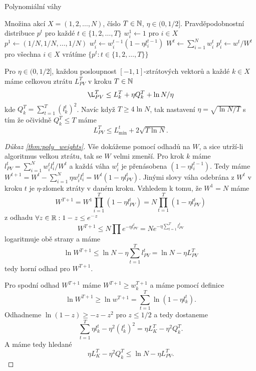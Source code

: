 
\begin{algorithm}
    \algrenewcommand{}
    \algrenewcommand{}
    \caption{Polynomiální váhy}
    \label{alg:poly_weights}
    \begin{algorithmic}[1]
        \Require  Množina akcí $X =(1,2,\dots,N)$, číslo $T \in \mathbb{N}$, $\eta \in (0,1/2]$.  
        \Ensure Pravděpodobnostní distribuce $p^t$ pro každé $t \in \{1,2,\dots, T\}$
        \State $w^1_i \leftarrow 1$ pro $i \in X$
        \State $p^1 \leftarrow (1/N,1/N,\dots,1/N)$
            \State $w^t_i \leftarrow w^{t-1}_i (1-\eta l^{t-1}_i)$
            \State $W^t \leftarrow \sum^N_{i=1} w^t_i$
            \State $p^t_i \leftarrow w^t/W^t$ pro všechna $i \in X$ 
        \EndFor
        \State vrátíme $\{p^t: t\in \{1,2,\dots,T\}\}$
    \end{algorithmic}
\end{algorithm}

\begin{theorem}
\label{thm:poly_weights}
Pro $\eta \in (0,1/2]$, každou posloupnost $[-1,1]$-ztrátových vektorů a každé $k \in X$ máme celkovou ztrátu $L^T_{PV}$ v kroku $T \in \mathbb{N}$ 
\[
    \L^T_{PV} \leq L^T_{k} + \eta Q^T_k + \ln N / \eta
\]
kde $Q^T_k = \sum^T_{t =1 } (l^t_k)^2$. 
Navíc když $T \geq 4\ln N$, tak nastavení $\eta = \sqrt{\ln N/T}$ s tím že očividně $Q^T_k \leq T$ máme 
\[
    L^T_{PV} \leq L^t_{\min} + 2\sqrt{T \ln N}. 
\]
\end{theorem}

\begin{proof}[Důkaz \ref{thm:poly_weights}]
   Vše dokážeme pomocí odhadů na $W$, a sice utrží-li algoritmus velkou ztrátu, tak se $W$ velmi zmenší. 
    Pro krok $k$ máme $l^t_{PV} = \sum^N_{i=1} w^t_i l^t_i /W^t$ a každá váha $w^t_i$ je přenásobena $(1-\eta l^{t-1}_i)$. 
    Tedy máme $W^{t+1} = W^t - \sum_{i=1}^N \eta w^t_i l^t_i = W^t(1-\eta l^t_{PV})$. 
    Jinými slovy váha odebrána z $W^t$ v kroku $t$ je $\eta$-zlomek ztráty v daném kroku. 
    Vzhledem k tomu, že $W^1 = N$ máme 
    $$ 
    W^{T+1} = W^1 \prod^T_{i=1}(1- \eta l^t_{PV}) = N \prod^T_{t=1}(1- \eta l^t_{PV})
    $$
    z odhadu $\forall z \in \mathbb{R}: 1-z \leq e^{-z}$
    \[
        W^{T+1} \leq N \prod e^{-\eta l^t_{PV}} = Ne^{-\eta \sum^T_{t=1} l^t_{PV}}
    \]
    logaritmuje obě strany a máme 
    \[
        \ln W^{T+1} \leq \ln N - \eta \sum^T_{t=1} l^t_{PV} = \ln N - \eta L^T_{PV} 
    \]
    tedy horní odhad pro $W^{T+1}$.

    Pro spodní odhad $W^{T+1}$ máme $W^{T+1} \geq w_k^{T+1}$ a máme pomocí definice 
    \[
        \ln W^{T+1} \geq \ln w^{T+1} = \sum^{T}_{t=1} \ln(1-\eta l_k^t). 
    \]
    Odhadneme $\ln (1-z) \geq -z-z^2$ pro $z \leq 1/2$ a tedy dostaneme
    \[
        \sum^{T}_{t=1} \eta l^t_k - \eta^2 (l^t_k)^2 = \eta L^T_K - \eta^2 Q_k^T. 
    \]
    A máme tedy hledané
    $$
    \eta L^T_K - \eta^2 Q_k^T \leq \ln N - \eta L^T_{PV}. 
    $$
\end{proof}

